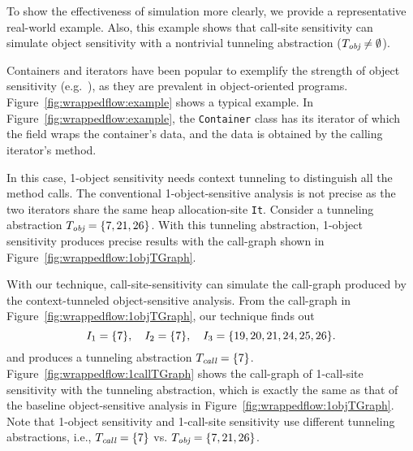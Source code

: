 


\label{sec:simulation:real-world}
To show the effectiveness of simulation more clearly, we provide a representative real-world example.
Also, this example shows that call-site sensitivity can simulate object sensitivity with a nontrivial tunneling abstraction ($T_{\text{\it obj}} \neq \emptyset$).



{
Containers and iterators have been popular to exemplify the strength
of object sensitivity (e.g.~\cite{Milanova2005,JeJeOh18,TanLX16}), as
they are prevalent in object-oriented
programs.
Figure~\ref{fig:wrappedflow:example} shows a typical example.
In Figure~\ref{fig:wrappedflow:example}, the {\tt Container} class has
its iterator of which the field wraps the container's
data, and the data is obtained by the calling iterator's method.
}

{
In this case, 1-object sensitivity needs context tunneling to distinguish all the method calls.
The conventional 1-object-sensitive analysis is not precise as
the two iterators share the same heap allocation-site {\tt It}. 
Consider a tunneling abstraction
$T_{\text{\it obj}} =\{7, 21, 26\}$.
With this tunneling abstraction, 1-object sensitivity produces precise
results with the
call-graph shown in Figure~\ref{fig:wrappedflow:1objTGraph}.
}


{
With our technique, call-site-sensitivity can simulate the call-graph
produced by the context-tunneled object-sensitive analysis. 
From the call-graph in Figure~\ref{fig:wrappedflow:1objTGraph}, our
technique finds out
\[
I_1 = \{ 7 \}, \quad  I_2 = \{7\},\quad I_3 =
\{19,20,21,24,25,26\}.
\]
and produces a tunneling abstraction $T_{\text{\it call}} = \{7\}$.
Figure~\ref{fig:wrappedflow:1callTGraph} shows the call-graph of
1-call-site sensitivity with the tunneling abstraction, which is
exactly the same as that of the baseline object-sensitive analysis
in Figure~\ref{fig:wrappedflow:1objTGraph}.
Note that 1-object sensitivity and 1-call-site sensitivity use
different tunneling abstractions, i.e., $T_{\text{\it call}} = \{7\}$ vs.
$T_{\text{\it obj}} = \{7, 21, 26\}$. 
}

